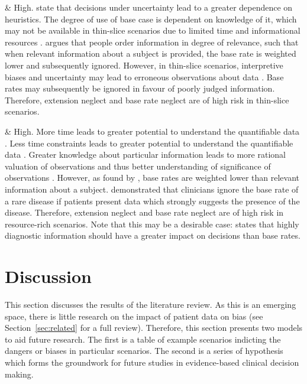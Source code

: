 \documentclass[a4paper]{scrartcl}     %
\newif\ifbreaksection
\begin{document}
\begin{landscape}
\begin{longtabu}
      & High.
        \citet{Tversky1974} state that decisions under uncertainty lead to a greater dependence on heuristics. The degree of use of base case is dependent on knowledge of it, which may not be available in thin-slice scenarios due to limited time and informational resources \citep{KahnemanDaniel2000}. \citet{Bar-Hillel1980} argues that people order information in degree of relevance, such that when relevant information about a subject is provided, the base rate is weighted lower and subsequently ignored.  However, in thin-slice scenarios, interpretive biases and uncertainty may lead to erroneous observations about data \citep{KahnemanDaniel2000}. Base rates may subsequently be ignored in favour of poorly judged information.
        Therefore, extension neglect and base rate neglect are of high risk in thin-slice scenarios.

      & High.
        More time leads to greater potential to understand the quantifiable data \citep{KahnemanDaniel2000}. Less time constraints leads to greater potential to understand the quantifiable data \citep{KahnemanDaniel2000}. Greater knowledge about particular information leads to more rational valuation of observations and thus better understanding of significance of observations \citep{Case1999,Edwards2001a}.  However, as found by \citet{Bar-Hillel1980}, base rates are weighted lower than relevant information about a subject. \citet{Casscells1978} demonstrated that clinicians ignore the base rate of a rare disease if patients present data which strongly suggests the presence of the disease.
        Therefore, extension neglect and base rate neglect are of high risk in resource-rich scenarios. Note that this may be a desirable case: \citet{Koehler1996} states that highly diagnostic information should have a greater impact on decisions than base rates. \\

    \bottomrule
    \end{longtabu}

  \end{landscape}
  \restoregeometry


\ifbreaksection\clearpage\fi\section{Discussion} %

  This section discusses the results of the literature review. As this is an emerging space, there is little research on the impact of patient data on bias (see Section~\ref{sec:related} for a full review). Therefore, this section presents two models to aid future research. The first is a table of example scenarios indicting the dangers or biases in particular scenarios. The second is a series of hypothesis which forms the groundwork for future studies in evidence-based clinical decision making.
\end{document}
